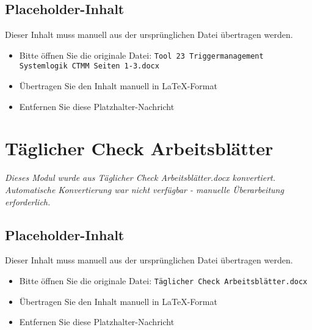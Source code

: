 \subsection{Placeholder-Inhalt}

Dieser Inhalt muss manuell aus der ursprünglichen Datei übertragen werden.

\begin{itemize}
\item Bitte öffnen Sie die originale Datei: \texttt{Tool 23 Triggermanagement Systemlogik CTMM Seiten 1-3.docx}
\item Übertragen Sie den Inhalt manuell in LaTeX-Format
\item Entfernen Sie diese Platzhalter-Nachricht
\end{itemize}




\section{Täglicher Check Arbeitsblätter}
\label{sec:täglicher-check-arbeitsblätter}

\begin{center}
\textit{Dieses Modul wurde aus Täglicher Check Arbeitsblätter.docx konvertiert.\\
Automatische Konvertierung war nicht verfügbar - manuelle Überarbeitung erforderlich.}
\end{center}


\subsection{Placeholder-Inhalt}

Dieser Inhalt muss manuell aus der ursprünglichen Datei übertragen werden.

\begin{itemize}
\item Bitte öffnen Sie die originale Datei: \texttt{Täglicher Check Arbeitsblätter.docx}
\item Übertragen Sie den Inhalt manuell in LaTeX-Format
\item Entfernen Sie diese Platzhalter-Nachricht
\end{itemize}


